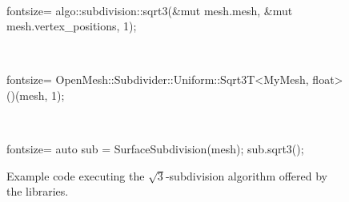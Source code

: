 \begin{figure}[p]
  \vspace{2mm}
  \\[-3mm]

  \hspace{.04\textwidth}
  \begin{minipage}{.9\textwidth}
    \begin{rustcode*}{fontsize=\footnotesize}
      algo::subdivision::sqrt3(&mut mesh.mesh, &mut mesh.vertex_positions, 1);
    \end{rustcode*}
  \end{minipage}\vspace{2mm}

  \vspace{2mm}
  \\[-3mm]

  \hspace{.04\textwidth}
  \begin{minipage}{.9\textwidth}
    \begin{cppcode*}{fontsize=\footnotesize}
      OpenMesh::Subdivider::Uniform::Sqrt3T<MyMesh, float>()(mesh, 1);
    \end{cppcode*}
  \end{minipage}\vspace{2mm}

  \vspace{2mm}
  \\[-3mm]

  \hspace{.04\textwidth}
  \begin{minipage}{.9\textwidth}
    \begin{cppcode*}{fontsize=\footnotesize}
      auto sub = SurfaceSubdivision(mesh);
      sub.sqrt3();
    \end{cppcode*}
  \end{minipage}

  \caption{
    Example code executing the $\sqrt{3}$-subdivision algorithm offered by the libraries.
  }
  \label{fig:example-sqrt3}
\end{figure}

